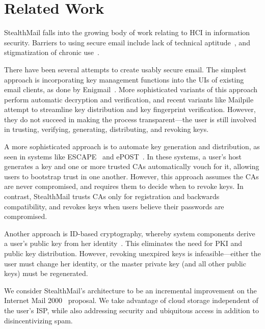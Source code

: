 \section{Related Work}
\label{sec:related-work}

StealthMail falls into the growing body of work relating to HCI in information security.  Barriers
to using secure email include lack of technical aptitude~\cite{garfinkel-email-survey, why-jonny-cant-encrypt}, and
stigmatization of chronic use~\cite{crypto-adoption-criteria}.

There have been several attempts to create usably secure email.
The simplest approach is incorporating key management functions into the 
UIs of existing email clients, as done by Enigmail~\cite{enigmail}.
More sophisticated variants of this approach perform automatic decryption
and verification, and recent variants like Mailpile~\cite{mailpile} attempt
to streamline key distribution and key fingerprint verification.  However, they do not
succeed in making the process transparent---the user is still involved in
trusting, verifying, generating, distributing, and revoking keys.

A more sophisticated approach is to automate key generation and distribution,
as seen in systems like ESCAPE~\cite{escape} and ePOST~\cite{epost}.
In these systems, a user's host generates a key and one or more trusted CAs
automatically vouch for it, allowing users to bootstrap trust in one another.
However, this approach assumes the CAs are never compromised, and requires them
to decide when to revoke keys.
In contrast, StealthMail trusts CAs only for registration and backwards
compatibility, and revokes keys when users believe 
their passwords are compromised.

Another approach is ID-based cryptography, whereby system components
derive a user's public key from her identity~\cite{id-based-cryptography}.  This 
eliminates the need for PKI and public key distribution.  However,
revoking unexpired keys is infeasible---either the user must change 
her identity, or the master private key (and all other public keys) must be 
regenerated.

We consider StealthMail's architecture to be an incremental improvement on
the Internet Mail 2000~\cite{im2k} proposal.  We take advantage of cloud storage 
independent of the user's ISP, while also addressing security and ubiquitous
access in addition to disincentivizing spam.
